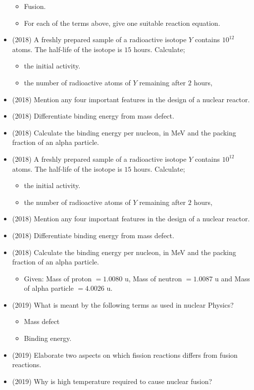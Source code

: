 \documentclass{article}
\begin{document}
\begin{itemize}
\begin{itemize}
\item Fusion.
\item For each of the terms above, give one suitable reaction equation. 
\end{itemize}
\item (2018)  A freshly prepared sample of a radioactive isotope $ Y$ contains $ 10^{12}$ atoms. The half-life of the isotope is $ 15$ hours. Calculate;\begin{itemize}
\item the initial activity. 
\item the number of radioactive atoms of $ Y$ remaining after $ 2$ hours, 
\end{itemize}
\item (2018)  Mention any four important features in the design of a nuclear reactor.
\item (2018)  Differentiate binding energy from mass defect.
\item (2018)  Calculate the binding energy per nucleon, in MeV and the packing fraction of an alpha particle.
\item (2018)  A freshly prepared sample of a radioactive isotope $ Y$ contains $ 10^{12}$ atoms. The half-life of the isotope is $ 15$ hours. Calculate;\begin{itemize}
\item the initial activity. 
\item the number of radioactive atoms of $ Y$ remaining after $ 2$ hours, 
\end{itemize}
\item (2018)  Mention any four important features in the design of a nuclear reactor.
\item (2018)  Differentiate binding energy from mass defect.
\item (2018)  Calculate the binding energy per nucleon, in MeV and the packing fraction of an alpha particle.\begin{itemize}
\item Given: Mass of proton $ =1.0080$ u, Mass of neutron $ =1.0087$ u and Mass of alpha particle $ =4.0026$ u.
\end{itemize}
\item (2019)  What is meant by the following terms as used in nuclear Physics?\begin{itemize}
\item Mass defect 
\item Binding energy. 
\end{itemize}
\item (2019)  Elaborate two aspects on which fission reactions differs from fusion reactions.
\item (2019)  Why is high temperature required to cause nuclear fusion? 
\end{itemize}
\end{document}
